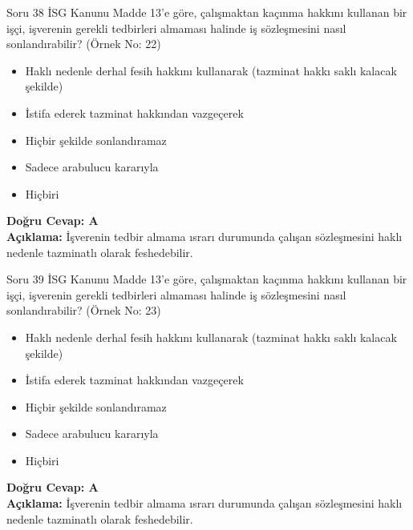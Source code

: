 \documentclass[12pt,a4paper]{article}
\begin{document}
\begin{testcard}{Soru 38}
    İSG Kanunu Madde 13'e göre, çalışmaktan kaçınma hakkını kullanan bir işçi, işverenin gerekli tedbirleri almaması halinde iş sözleşmesini nasıl sonlandırabilir? (Örnek No: 22)
    \begin{itemize}
        \item[A)] Haklı nedenle derhal fesih hakkını kullanarak (tazminat hakkı saklı kalacak şekilde)
        \item[B)] İstifa ederek tazminat hakkından vazgeçerek
        \item[C)] Hiçbir şekilde sonlandıramaz
        \item[D)] Sadece arabulucu kararıyla
        \item[E)] Hiçbiri
    \end{itemize}
    \tcblower
    \textbf{Doğru Cevap: A} \\
    \textbf{Açıklama:} İşverenin tedbir almama ısrarı durumunda çalışan sözleşmesini haklı nedenle tazminatlı olarak feshedebilir.
\end{testcard}

\begin{testcard}{Soru 39}
    İSG Kanunu Madde 13'e göre, çalışmaktan kaçınma hakkını kullanan bir işçi, işverenin gerekli tedbirleri almaması halinde iş sözleşmesini nasıl sonlandırabilir? (Örnek No: 23)
    \begin{itemize}
        \item[A)] Haklı nedenle derhal fesih hakkını kullanarak (tazminat hakkı saklı kalacak şekilde)
        \item[B)] İstifa ederek tazminat hakkından vazgeçerek
        \item[C)] Hiçbir şekilde sonlandıramaz
        \item[D)] Sadece arabulucu kararıyla
        \item[E)] Hiçbiri
    \end{itemize}
    \tcblower
    \textbf{Doğru Cevap: A} \\
    \textbf{Açıklama:} İşverenin tedbir almama ısrarı durumunda çalışan sözleşmesini haklı nedenle tazminatlı olarak feshedebilir.
\end{testcard}
\end{document}
